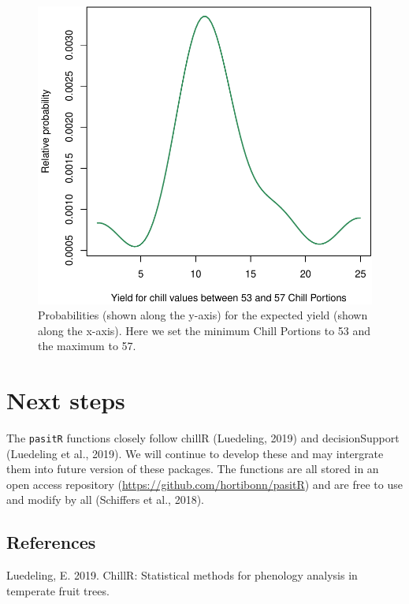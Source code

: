\documentclass[]{article}
\begin{document}
\begin{figure}
\centering
\includegraphics{Abstract_SHE_Chill_Yield_Model_files/figure-latex/unnamed-chunk-6-1.pdf}
\caption{Probabilities (shown along the y-axis) for the expected yield
(shown along the x-axis). Here we set the minimum Chill Portions to 53
and the maximum to 57.}
\end{figure}

\hypertarget{next-steps}{%
\section{Next steps}\label{next-steps}}

The \texttt{pasitR} functions closely follow chillR (Luedeling, 2019)
and decisionSupport (Luedeling et al., 2019). We will continue to
develop these and may intergrate them into future version of these
packages. The functions are all stored in an open access repository
(\url{https://github.com/hortibonn/pasitR}) and are free to use and
modify by all (Schiffers et al., 2018).

\hypertarget{references}{%
\subsection*{References}\label{references}}

\hypertarget{refs}{}
\leavevmode\hypertarget{ref-R-chillR}{}%
Luedeling, E. 2019. ChillR: Statistical methods for phenology analysis
in temperate fruit trees.
\end{document}
